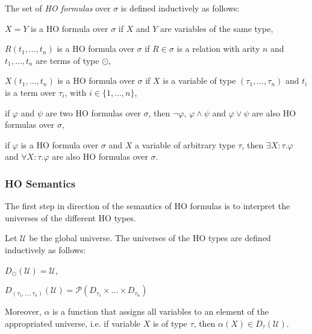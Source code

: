 \begin{definition}
    The set of \emph{HO formulas} over $\sigma$ is defined inductively as follows:
    \begin{compactitem}
        \item $X = Y$ is a HO formula over $\sigma$ if $X$ and $Y$ are variables of the same type,
        \item $R(t_1, \dots, t_n)$ is a HO formula over $\sigma$ if $R \in \sigma$ is a relation with arity $n$ and
        $t_1, \dots, t_n$ are terms of type $\odot$,
        \item $X(t_1, \dots, t_n)$ is a HO formula over $\sigma$ if $X$ is a variable of type $(\tau_1, \dots, \tau_n)$
        and $t_i$ is a term over $\tau_i$, with $i \in \{1, \dots, n\}$,
        \item if $\varphi$ and $\psi$ are two HO formulas over $\sigma$, then $\neg\varphi$, $\varphi\wedge\psi$ and $\varphi
        \vee \psi$ are also HO formulas over $\sigma$,
        \item if $\varphi$ is a HO formula over $\sigma$ and $X$ a variable of arbitrary type $\tau$, then $\exists
        X \colon \tau.\varphi$ and
        $\forall X \colon \tau.\varphi$ are also HO formulas over $\sigma$.
    \end{compactitem}
\end{definition}

\subsubsection{HO Semantics}

The first step in direction of the semantics of HO formulas is to interpret the universes of the different HO types.

\begin{definition}
    Let $\mathcal{U}$ be the global universe. The universes of the HO types are defined inductively as follows:
    \begin{compactitem}
        \item $D_\odot(\mathcal{U}) = \mathcal{U}$,
        \item $D_{(\tau_1, \dots, \tau_n)}(\mathcal{U}) = \mathcal{P}(D_{\tau_1} \times \dots \times D_{\tau_n})$
    \end{compactitem}
\end{definition}

Moreover, $\alpha$ is a function that assigns all variables to an element of the appropriated universe, i.e. if
variable $X$ is of type $\tau$, then $\alpha(X) \in D_{\tau}(\mathcal{U})$.

